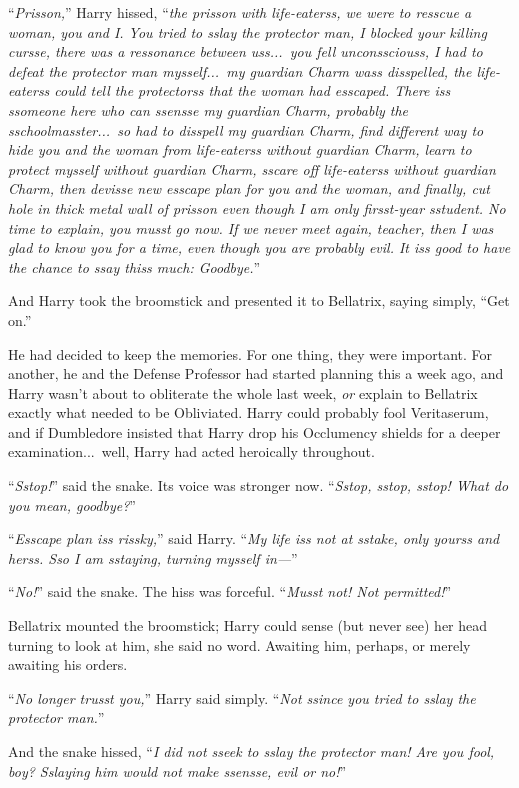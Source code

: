 “\emph{Prisson,}” Harry hissed, “\emph{the prisson with life-eaterss, we were to resscue a woman, you and I. You tried to sslay the protector man, I blocked your killing cursse, there was a ressonance between uss...\ you fell unconssciouss, I had to defeat the protector man mysself...\ my guardian Charm wass disspelled, the life-eaterss could tell the protectorss that the woman had esscaped. There iss ssomeone here who can ssensse my guardian Charm, probably the sschoolmasster...\ so had to disspell my guardian Charm, find different way to hide you and the woman from life-eaterss without guardian Charm, learn to protect mysself without guardian Charm, sscare off life-eaterss without guardian Charm, then devisse new esscape plan for you and the woman, and finally, cut hole in thick metal wall of prisson even though I am only firsst-year sstudent. No time to explain, you musst go now. If we never meet again, teacher, then I was glad to know you for a time, even though you are probably evil. It iss good to have the chance to ssay thiss much: Goodbye.}”

And Harry took the broomstick and presented it to Bellatrix, saying simply, “Get on.”

He had decided to keep the memories. For one thing, they were important. For another, he and the Defense Professor had started planning this a week ago, and Harry wasn’t about to obliterate the whole last week, \emph{or} explain to Bellatrix exactly what needed to be Obliviated. Harry could probably fool Veritaserum, and if Dumbledore insisted that Harry drop his Occlumency shields for a deeper examination...\ well, Harry had acted heroically throughout.

“\emph{Sstop!}” said the snake. Its voice was stronger now. “\emph{Sstop, sstop, sstop! What do you mean, goodbye?}”

“\emph{Esscape plan iss rissky,}” said Harry. “\emph{My life iss not at sstake, only yourss and herss. Sso I am sstaying, turning mysself in—}”

“\emph{No!}” said the snake. The hiss was forceful. “\emph{Musst not! Not permitted!}”

Bellatrix mounted the broomstick; Harry could sense (but never see) her head turning to look at him, she said no word. Awaiting him, perhaps, or merely awaiting his orders.

“\emph{No longer trusst you,}” Harry said simply. “\emph{Not ssince you tried to sslay the protector man.}”

And the snake hissed, “\emph{I did not sseek to sslay the protector man! Are you fool, boy? Sslaying him would not make ssensse, evil or no!}”

